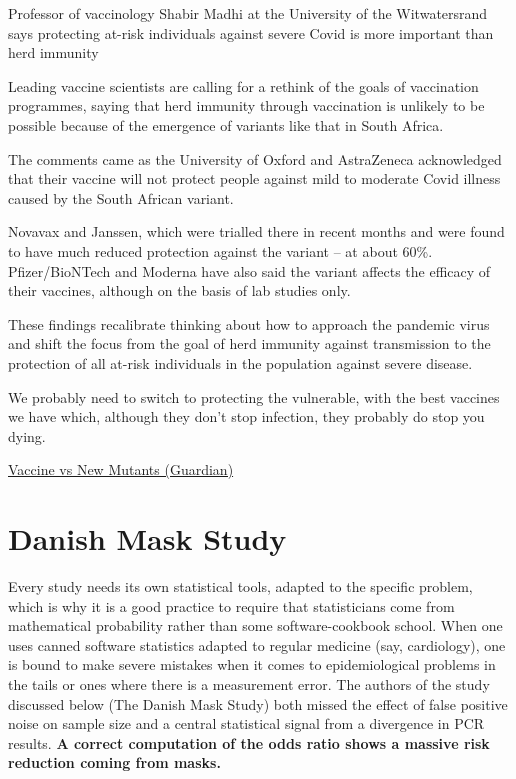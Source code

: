\documentclass[
]{book}
\begin{document}
Professor of vaccinology Shabir Madhi at the University of the Witwatersrand says protecting at-risk individuals against severe Covid is more important than herd immunity

Leading vaccine scientists are calling for a rethink of the goals of vaccination programmes, saying that herd immunity through vaccination is unlikely to be possible because of the emergence of variants like that in South Africa.

The comments came as the University of Oxford and AstraZeneca acknowledged that their vaccine will not protect people against mild to moderate Covid illness caused by the South African variant.

Novavax and Janssen, which were trialled there in recent months and were found to have much reduced protection against the variant -- at about 60\%. Pfizer/BioNTech and Moderna have also said the variant affects the efficacy of their vaccines, although on the basis of lab studies only.

These findings recalibrate thinking about how to approach the pandemic virus and shift the focus from the goal of herd immunity against transmission to the protection of all at-risk individuals in the population against severe disease.

We probably need to switch to protecting the vulnerable, with the best vaccines we have which, although they don't stop infection, they probably do stop you dying.

\href{https://www.theguardian.com/society/2021/feb/07/scientists-call-for-rethink-as-doubts-grow-about-achieving-herd-immunity}{Vaccine vs New Mutants (Guardian)}

\hypertarget{danish-mask-study}{%
\section{Danish Mask Study}\label{danish-mask-study}}

Every study needs its own statistical tools, adapted to the specific problem, which is why it is a good practice to require that statisticians come from mathematical probability rather than some software-cookbook school. When one uses canned software statistics adapted to regular medicine (say, cardiology), one is bound to make severe mistakes when it comes to epidemiological problems in the tails or ones where there is a measurement error. The authors of the study discussed below (The Danish Mask Study) both missed the effect of false positive noise on sample size and a central statistical signal from a divergence in PCR results.
\textbf{A correct computation of the odds ratio shows a massive risk reduction coming from masks.}
\end{document}
